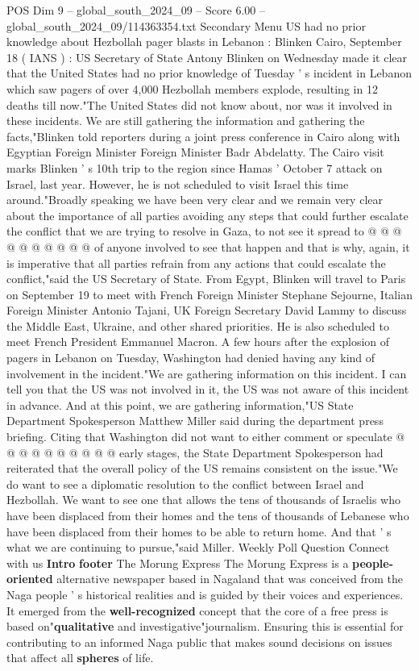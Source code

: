 \begin{textsample}{POS Dim 9 – global\_south\_2024\_09 – Score 6.00 – global\_south\_2024\_09/114363354.txt}  \label{ex:f9_pos_251}
Secondary Menu US had no prior knowledge about Hezbollah pager blasts in Lebanon : Blinken Cairo, September 18 ( IANS ) : US Secretary of State Antony Blinken on Wednesday made it clear that the United States had no prior knowledge of Tuesday ' s incident in Lebanon which saw pagers of over 4,000 Hezbollah members explode, resulting in 12 deaths till now."The United States did not know about, nor was it involved in these incidents.
We are still gathering the information and gathering the facts,"Blinken told reporters during a joint press conference in Cairo along with Egyptian Foreign Minister Foreign Minister Badr Abdelatty.
The Cairo visit marks Blinken ' s 10th trip to the region since Hamas ' October 7 attack on Israel, last year.
However, he is not scheduled to visit Israel this time around."Broadly speaking we have been very clear and we remain very clear about the importance of all parties avoiding any steps that could further escalate the conflict that we are trying to resolve in Gaza, to not see it spread to @ @ @ @ @ @ @ @ @ @ of anyone involved to see that happen and that is why, again, it is imperative that all parties refrain from any actions that could escalate the conflict,"said the US Secretary of State.
From Egypt, Blinken will travel to Paris on September 19 to meet with French Foreign Minister Stephane Sejourne, Italian Foreign Minister Antonio Tajani, UK Foreign Secretary David Lammy to discuss the Middle East, Ukraine, and other shared priorities.
He is also scheduled to meet French President Emmanuel Macron.
A few hours after the explosion of pagers in Lebanon on Tuesday, Washington had denied having any kind of involvement in the incident."We are gathering information on this incident.
I can tell you that the US was not involved in it, the US was not aware of this incident in advance.
And at this point, we are gathering information,"US State Department Spokesperson Matthew Miller said during the department press briefing.
Citing that Washington did not want to either comment or speculate @ @ @ @ @ @ @ @ @ @ early stages, the State Department Spokesperson had reiterated that the overall policy of the US remains consistent on the issue."We do want to see a diplomatic resolution to the conflict between Israel and Hezbollah.
We want to see one that allows the tens of thousands of Israelis who have been displaced from their homes and the tens of thousands of Lebanese who have been displaced from their homes to be able to return home.
And that ' s what we are continuing to pursue,"said Miller.
Weekly Poll Question Connect with us \textbf{Intro} \textbf{footer} The Morung Express The Morung Express is a \textbf{people-oriented} alternative newspaper based in Nagaland that was conceived from the Naga people ' s historical realities and is guided by their voices and experiences.
It emerged from the \textbf{well-recognized} concept that the core of a free press is based on"\textbf{qualitative} and investigative"journalism.
Ensuring this is essential for contributing to an informed Naga public that makes sound decisions on issues that affect all \textbf{spheres} of life.


\end{textsample}
